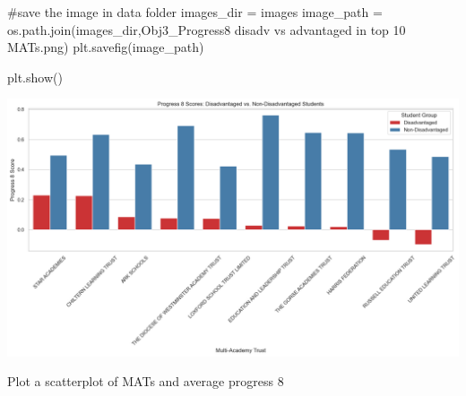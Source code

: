 \documentclass[
  letterpaper,
  DIV=11,
  numbers=noendperiod]{scrartcl}
\newenvironment{Shaded}{\begin{snugshade}}{\end{snugshade}}
\newcommand{\CommentTok}[1]{\textcolor[rgb]{0.37,0.37,0.37}{#1}}
\newcommand{\NormalTok}[1]{\textcolor[rgb]{0.00,0.23,0.31}{#1}}
\newcommand{\OperatorTok}[1]{\textcolor[rgb]{0.37,0.37,0.37}{#1}}
\newcommand{\StringTok}[1]{\textcolor[rgb]{0.13,0.47,0.30}{#1}}
\begin{document}
\begin{Shaded}
\begin{Highlighting}[]
\CommentTok{\#save the image in data folder}
\NormalTok{images\_dir }\OperatorTok{=} \StringTok{\textquotesingle{}images\textquotesingle{}}
\NormalTok{image\_path }\OperatorTok{=}\NormalTok{ os.path.join(images\_dir,}\StringTok{\textquotesingle{}Obj3\_Progress8 disadv vs advantaged in top 10 MATs.png\textquotesingle{}}\NormalTok{)}
\NormalTok{plt.savefig(image\_path)}

\NormalTok{plt.show()}
\end{Highlighting}
\end{Shaded}

\includegraphics{P4DS_A2_Data_Analysis_Project_files/figure-pdf/cell-100-output-1.png}

Plot a scatterplot of MATs and average progress 8
\end{document}
